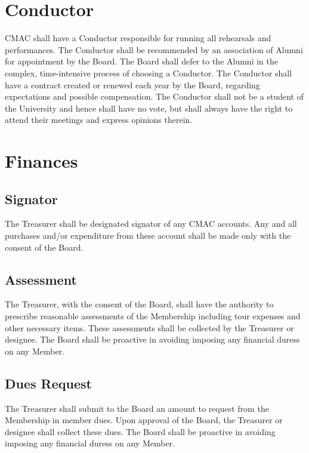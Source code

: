 \documentclass{article}
\begin{document}
\section{Conductor} \label{conductor}

CMAC shall have a Conductor responsible for running all rehearsals and
performances. The Conductor shall be recommended by an association of Alumni for
appointment by the Board. The Board shall defer to the Alumni in the complex,
time-intensive process of choosing a Conductor.  The Conductor shall have a
contract created or renewed each year by the Board, regarding expectations and
possible compensation. The Conductor shall not be a student of the University
and hence shall have no vote, but shall always have the right to attend their
meetings and express opinions therein.

\section{Finances}

\subsection{Signator}

The Treasurer shall be designated signator of any CMAC accounts. Any and all
purchases and/or expenditure from these account shall be made only with the
consent of the Board.

\subsection{Assessment}

The Treasurer, with the consent of the Board, shall have the authority
to prescribe reasonable assessments of the Membership including
tour expenses and other necessary items. These assessments shall be
collected by the Treasurer or designee. The Board shall be proactive in avoiding
imposing any financial duress on any Member.

\subsection{Dues Request}

The Treasurer shall submit to the Board an amount to request from
the Membership in member dues. Upon approval of the Board, the Treasurer
or designee shall collect these dues. The Board shall be proactive in avoiding
imposing any financial duress on any Member.
\end{document}
